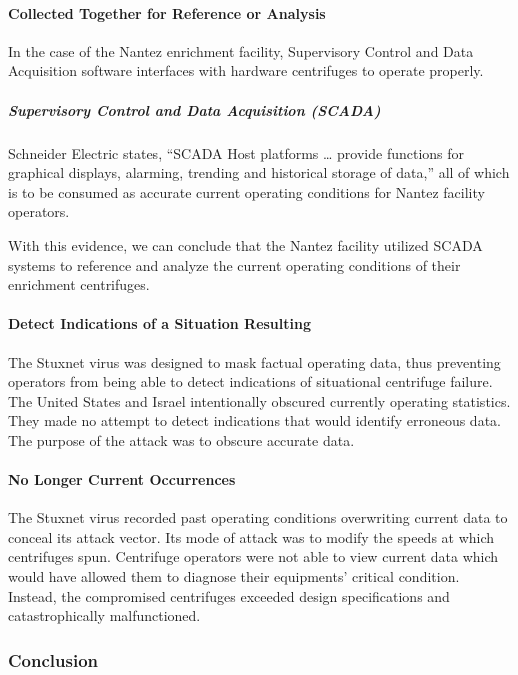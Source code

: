 \documentclass[12pt]{article}
\begin{document}
\begin{multicols}{2}
\paragraph{Collected Together for Reference or Analysis}

In the case of the Nantez enrichment facility, Supervisory Control and Data Acquisition software interfaces with hardware centrifuges to operate properly.

\subparagraph{Supervisory Control and Data Acquisition (SCADA)}

Schneider Electric states, ``SCADA Host platforms … provide functions for graphical displays, alarming, trending and historical storage of data,'' all of which is to be consumed as accurate current operating conditions for Nantez facility operators.\cite{schneiderElectric}

With this evidence, we can conclude that the Nantez facility utilized SCADA systems to reference and analyze the current operating conditions of their enrichment centrifuges.


\paragraph{Detect Indications of a Situation Resulting}

The Stuxnet virus was designed to mask factual operating data, thus preventing operators from being able to detect indications of situational centrifuge failure. The United States and Israel intentionally obscured currently operating statistics. They made no attempt to detect indications that would identify erroneous data. The purpose of the attack was to obscure accurate data.

\paragraph{No Longer Current Occurrences}

The Stuxnet virus recorded past operating conditions overwriting current data to conceal its attack vector.  Its mode of attack was to modify the speeds at which centrifuges spun. Centrifuge operators were not able to view current data which would have allowed them to diagnose their equipments' critical condition. Instead, the compromised centrifuges exceeded design specifications and catastrophically malfunctioned.

\subsubsection{Conclusion}


\end{multicols}
\end{document}
